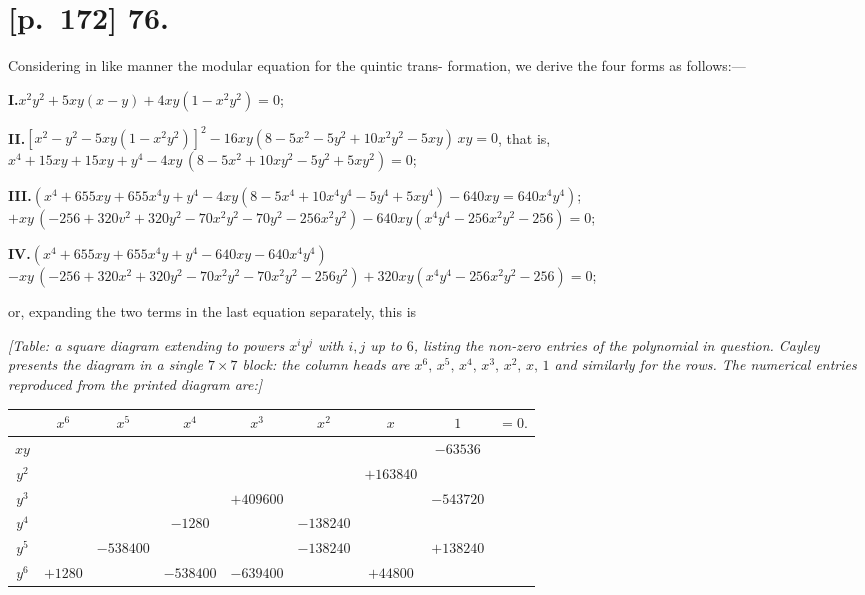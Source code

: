 \documentclass[11pt]{article}
\begin{document}
\section*{[p.~172] \textbf{76.}}
Considering in like manner the modular equation for the quintic trans-
formation, we derive the four forms as follows:---

\smallskip
\noindent\textbf{I.}\quad $x^2y^2+5xy(x-y)+4xy(1-x^2y^2)=0$;

\smallskip
\noindent\textbf{II.}\quad $[x^2-y^2-5xy(1-x^2y^2)]^2-16xy(8-5x^2-5y^2+10x^2y^2-5xy)\,xy=0$, that is,
$x^4+15xy+15xy+y^4-4xy\,(8-5x^2+10xy^2-5y^2+5xy^2)=0$;

\smallskip
\noindent\textbf{III.}\quad $(x^4+655xy+655x^4y+y^4-4xy(8-5x^4+10x^4y^4-5y^4+5xy^4)\!-640xy=640x^4y^4)$;\\
$+xy\,(-256+320v^2+320y^2-70x^2y^2-70y^2-256x^2y^2)\!-640xy(x^4y^4-256x^2y^2-256)=0$;

\smallskip
\noindent\textbf{IV.}\quad $(x^4+655xy+655x^4y+y^4-640xy-640x^4y^4)$\\
$-xy\,(-256+320x^2+320y^2-70x^2y^2-70x^2y^2-256y^2)\!+320xy(x^4y^4-256x^2y^2-256)=0$;

or, expanding the two terms in the last equation separately, this is

\noindent\textit{[Table: a square diagram extending to powers $x^iy^j$ with $i,j$ up to $6$, listing
the non-zero entries of the polynomial in question. Cayley presents the
diagram in a single $7\times 7$ block: the column heads are $x^6,\,x^5,\,x^4,\,x^3,\,x^2,\,x,\,1$
and similarly for the rows. The numerical entries reproduced from the printed
diagram are:]}
\begin{center}
\renewcommand{\arraystretch}{1.05}
\begin{tabular}{|c|c|c|c|c|c|c|c|c|}
\hline
       & $x^6$ & $x^5$ & $x^4$ & $x^3$ & $x^2$ & $x$ & $1$ & $=0.$\\
\hline
$x y$         &        &       &        &        &        &       & $-63536$ &     \\
\hline
$y^2$         &        &       &        &        &        & $+163840$ &        &     \\
\hline
$y^3$         &        &       &        & $+409600$ &        &        & $-543720$ &     \\
\hline
$y^4$         &        &       & $-1280$ &        & $-138240$ &        &        &     \\
\hline
$y^5$         &        & $-538400$ &       &        & $-138240$ &        & $+138240$ & \\
\hline
$y^6$         & $+1280$ &       & $-538400$ & $-639400$ &        & $+44800$ &        &     \\
\hline
\end{tabular}
\end{center}
\end{document}
